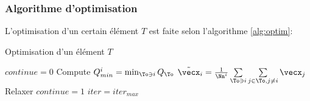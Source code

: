 \subsubsection{Algorithme d'optimisation}

\indent L'optimisation d'un certain élément \(T\) est faite selon l'algorithme \eqref{alg:optim}: 

\begin{algorithm}
	\caption{Optimisation d'un élément \(T\) \label{alg:optim}}
	\begin{algorithmic}
			\State \(continue = 0\)
				\State Compute $ Q_{min}^i = \min_{\To \ni i} Q_{\To} $ 
				\State $  \tilde{\vecx}_i = \frac{1}{\Nn^i} \sum\limits_{\To \ni i} { \sum\limits_{j \in \To, j\neq i}{\vecx_j}  } $ 
			\EndFor
			  
				\State Relaxer
			\EndIf
			\If {$|\tilde{\vecx} - \vecx| > \epsilon $} 
				\State \(continue = 1\)
			\EndIf
				\State $ iter = iter_{max} $
			\EndIf
		\EndFor  
	\end{algorithmic}
\end{algorithm}